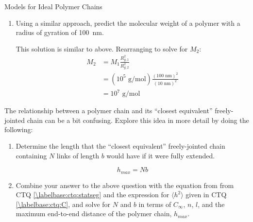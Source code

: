 \begin{activity}{Models for Ideal Polymer Chains}
\begin{exercises}
\begin{enumerate}
			\item Using a similar approach, predict the molecular weight of a polymer with a radius of gyration of 100~nm.
	
		\begin{solution}{}
			This solution is similar to above.  Rearranging to solve for $M_2$:
			\begin{align*}
				M_2 &= M_1\frac{R_{g,1}^2}{R_{g,2}^2}\\
				&= (10^5\text{ g/mol})\frac{(100\text{ nm})^2}{(10\text{ nm})^2}\\
				&= 10^7\text{ g/mol}
			\end{align*}
		\end{solution}
		\end{enumerate}
		
	\exercise \label{\labelbase:exc:statseg} The relationship between a polymer chain and its ``closest equivalent'' freely-jointed chain can be a bit confusing.  Explore this idea in more detail by doing the following:
	
		\begin{enumerate}
		
			\item Determine the length that the ``closest equivalent'' freely-jointed chain containing $N$ links of length $b$ would have if it were fully extended. \label{\labelbase:ctq:Nb}
	
			\begin{solution}{}
				\begin{equation*}
					h_{max} = Nb
				\end{equation*}
			\end{solution}
			
			\item Combine your answer to the above question with the equation from from CTQ \ref{\labelbase:ctq:statseg} and the expression for $\langle h^2\rangle$ given in CTQ \ref{\labelbase:ctq:C}, and solve for $N$ and $b$ in terms of $C_\infty$, $n$, $l$, and the maximum end-to-end distance of the polymer chain, $h_{max}$.
				

\end{enumerate}
\end{exercises}
\end{activity}
